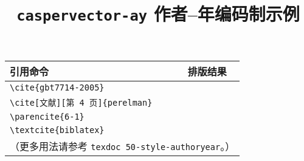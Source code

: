 \documentclass[UTF8]{ctexart}
\begin{document}
\title{\textbf{\texttt{caspervector-ay} 作者--年编码制示例}}
\author{}
\date{}
\maketitle
\vspace*{-1em}

\begin{center}
\begin{tabular}{ll}
\hline
引用命令 &	排版结果 \\\hline
\verb|\cite{gbt7714-2005}| &	\cite{gbt7714-2005} \\
\verb|\cite[文献][第 4 页]{perelman}| &	\cite[文献][第 4 页]{perelman} \\
\verb|\parencite{6-1}| &	\parencite{6-1} \\
\verb|\textcite{biblatex}| &	\textcite{biblatex} \\\hline
\multicolumn{2}{l}{（更多用法请参考 \texttt{texdoc 50-style-authoryear}。）} \\
\end{tabular}
\end{center}
\vspace*{1em}

\printbibliography
\nocite{*}
\end{document}
